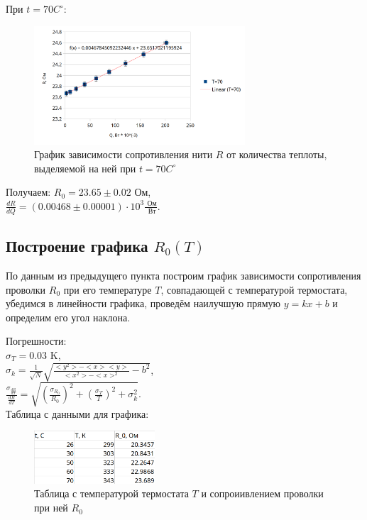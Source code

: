 \documentclass[a4paper]{article}
\begin{document}
При $t = 70C^\circ$:
\begin{figure}[ht]
    \centering
    \includegraphics[width=0.7\textwidth]{charts_R_Q/T_70.png}
    \caption{График зависимости сопротивления нити $R$ от количества теплоты, выделяемой на ней при $t = 70C^\circ$}
\end{figure}

Получаем:
$R_0 = 23.65 \pm 0.02\text{ Ом}$,\\

$\frac{dR}{dQ} = (0.00468 \pm 0.00001) \cdot 10^3 \frac{\text{ Ом}}{\text{ Вт}}$. \\


\subsection{Построение графика $R_0(T)$}

По данным из предыдущего пункта построим график зависимости сопротивления проволки $R_0$ при его температуре $T$, совпадающей с температурой термостата, убедимся в линейности графика, проведём наилучшую прямую $y = kx + b$ и определим его угол наклона.

Погрешности:   \\

$\sigma_T = 0.03 \text{ K}$, \\

$\sigma_k = \frac{1}{\sqrt{N}} \sqrt{\frac{<y^2> - <x><y>}{<x^2> - <x>^2} - b^2}$, \\

$\frac{\sigma_{\frac{dR}{dT}}}{\frac{dR}{dT}} = \sqrt{(\frac{\sigma_{R_0}}{R_0})^2 + (\frac{\sigma_T}{T})^2 + \sigma_k^2}$. \\

Таблица с данными для графика:
\begin{figure}[ht]
    \centering
    \includegraphics[width=0.4\textwidth]{R0_T/table_R0_T.png}
    \caption{Таблица с температурой термостата $T$ и сопроиивлением проволки при ней $R_0$}
\end{figure}
\end{document}
